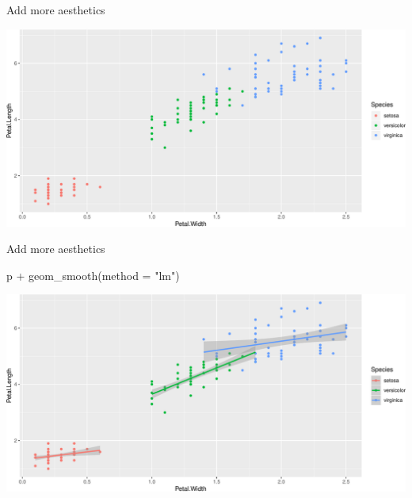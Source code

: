 \documentclass[14pt,ignorenonframetext,]{bredelebeamer}
\newenvironment{Shaded}{\begin{snugshade}}{\end{snugshade}}
\newcommand{\KeywordTok}[1]{\textcolor[rgb]{0.94,0.87,0.69}{#1}}
\newcommand{\DataTypeTok}[1]{\textcolor[rgb]{0.87,0.87,0.75}{#1}}
\newcommand{\StringTok}[1]{\textcolor[rgb]{0.80,0.58,0.58}{#1}}
\newcommand{\CommentTok}[1]{\textcolor[rgb]{0.50,0.62,0.50}{#1}}
\newcommand{\OperatorTok}[1]{\textcolor[rgb]{0.94,0.94,0.82}{#1}}
\newcommand{\NormalTok}[1]{\textcolor[rgb]{0.80,0.80,0.80}{#1}}
\begin{document}
\begin{frame}[fragile]{Add more aesthetics}

\begin{Shaded}
\end{Shaded}

\includegraphics{tidyverse_28_03_files/figure-beamer/ggplot5-1.pdf}

\end{frame}

\begin{frame}[fragile]{Add more aesthetics}

\begin{Shaded}
\begin{Highlighting}[]
\NormalTok{p }\OperatorTok{+}\StringTok{ }\KeywordTok{geom_smooth}\NormalTok{(}\DataTypeTok{method =} \StringTok{"lm"}\NormalTok{)}
\end{Highlighting}
\end{Shaded}

\includegraphics{tidyverse_28_03_files/figure-beamer/ggplot6-1.pdf}

\end{frame}
\end{document}

